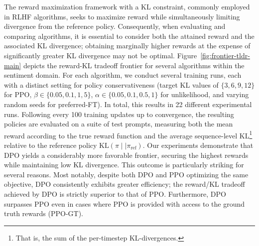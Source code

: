 The reward maximization framework with a KL constraint, commonly employed in RLHF algorithms, seeks to maximize reward while simultaneously limiting divergence from the reference policy. Consequently, when evaluating and comparing algorithms, it is essential to consider both the attained reward and the associated KL divergence; obtaining marginally higher rewards at the expense of significantly greater KL divergence may not be optimal. Figure~\ref{fig:frontier-tldr-main} depicts the reward-KL tradeoff frontier for several algorithms within the sentiment domain. For each algorithm, we conduct several training runs, each with a distinct setting for policy conservativeness (target KL values of $\{3,6,9,12\}$ for PPO, $\beta \in \{0.05,0.1,1,5\}$, $\alpha\in\{0.05,0.1,0.5,1\}$ for unlikelihood, and varying random seeds for preferred-FT). In total, this results in 22 different experimental runs. Following every 100 training updates up to convergence, the resulting policies are evaluated on a suite of test prompts, measuring both the mean reward according to the true reward function and the average sequence-level KL\footnote{That is, the sum of the per-timestep KL-divergences.} relative to the reference policy $\text{KL}\left(\pi\mid \mid \pi_\text{ref}\right)$. Our experiments demonstrate that DPO yields a considerably more favorable frontier, securing the highest rewards while maintaining low KL divergence. This outcome is particularly striking for several reasons. Most notably, despite both DPO and PPO optimizing the same objective, DPO consistently exhibits greater efficiency; the reward/KL tradeoff achieved by DPO is strictly superior to that of PPO. Furthermore, DPO surpasses PPO even in cases where PPO is provided with access to the ground truth rewards (PPO-GT).

